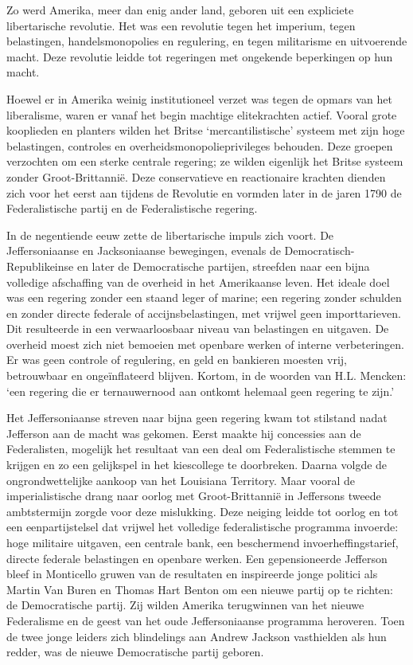 \documentclass[
  a5paper,
  smalldemyvopaper,10pt,twoside,onecolumn,openright,extrafontsizes,hidelinks]{memoir}
\begin{document}
Zo werd Amerika, meer dan enig ander land, geboren uit een expliciete
libertarische revolutie. Het was een revolutie tegen het imperium, tegen
belastingen, handelsmonopolies en regulering, en tegen militarisme en
uitvoerende macht. Deze revolutie leidde tot regeringen met ongekende
beperkingen op hun macht.

Hoewel er in Amerika weinig institutioneel verzet was tegen de opmars
van het liberalisme, waren er vanaf het begin machtige elitekrachten
actief. Vooral grote kooplieden en planters wilden het Britse
`mercantilistische' systeem met zijn hoge belastingen, controles en
overheidsmonopolieprivileges behouden. Deze groepen verzochten om een
sterke centrale regering; ze wilden eigenlijk het Britse systeem zonder
Groot-Brittannië. Deze conservatieve en reactionaire krachten dienden
zich voor het eerst aan tijdens de Revolutie en vormden later in de
jaren 1790 de Federalistische partij en de Federalistische regering.

In de negentiende eeuw zette de libertarische impuls zich voort. De
Jeffersoniaanse en Jacksoniaanse bewegingen, evenals de
Democratisch-Republikeinse en later de Democratische partijen, streefden
naar een bijna volledige afschaffing van de overheid in het Amerikaanse
leven. Het ideale doel was een regering zonder een staand leger of
marine; een regering zonder schulden en zonder directe federale of
accijnsbelastingen, met vrijwel geen importtarieven. Dit resulteerde in
een verwaarloosbaar niveau van belastingen en uitgaven. De overheid
moest zich niet bemoeien met openbare werken of interne verbeteringen.
Er was geen controle of regulering, en geld en bankieren moesten vrij,
betrouwbaar en ongeïnflateerd blijven. Kortom, in de woorden van H.L.
Mencken: `een regering die er ternauwernood aan ontkomt helemaal geen
regering te zijn.'

Het Jeffersoniaanse streven naar bijna geen regering kwam tot stilstand
nadat Jefferson aan de macht was gekomen. Eerst maakte hij concessies
aan de Federalisten, mogelijk het resultaat van een deal om
Federalistische stemmen te krijgen en zo een gelijkspel in het
kiescollege te doorbreken. Daarna volgde de ongrondwettelijke aankoop
van het Louisiana Territory. Maar vooral de imperialistische drang naar
oorlog met Groot-Brittannië in Jeffersons tweede ambtstermijn zorgde
voor deze mislukking. Deze neiging leidde tot oorlog en tot een
eenpartijstelsel dat vrijwel het volledige federalistische programma
invoerde: hoge militaire uitgaven, een centrale bank, een beschermend
invoerheffingstarief, directe federale belastingen en openbare werken.
Een gepensioneerde Jefferson bleef in Monticello gruwen van de
resultaten en inspireerde jonge politici als Martin Van Buren en Thomas
Hart Benton om een nieuwe partij op te richten: de Democratische partij.
Zij wilden Amerika terugwinnen van het nieuwe Federalisme en de geest
van het oude Jeffersoniaanse programma heroveren. Toen de twee jonge
leiders zich blindelings aan Andrew Jackson vasthielden als hun redder,
was de nieuwe Democratische partij geboren.
\end{document}
